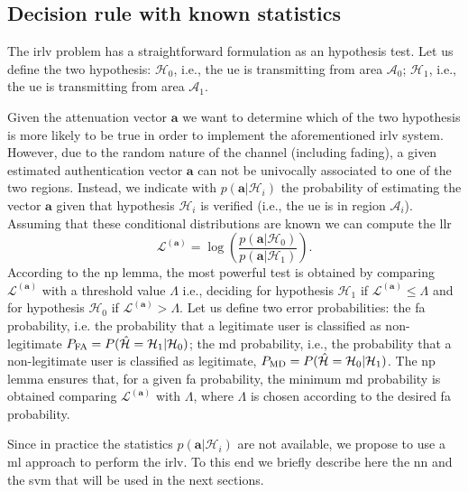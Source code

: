 \documentclass[draftcls,onecolumn,12pt]{IEEEtran}
\begin{document}
\subsection{Decision rule with known statistics}\label{sec:auth}
The \ac{irlv} problem has a straightforward formulation as an hypothesis test. Let us define the two hypothesis: $\mathcal{H}_0$, i.e., the \ac{ue} is transmitting from area $\mathcal{A}_0$; $\mathcal{H}_1$, i.e., the \ac{ue} is transmitting from area $\mathcal{A}_1$.

Given the attenuation vector $\bm{a}$ we want to determine which of the two hypothesis is more likely to be true in order to implement the aforementioned \ac{irlv} system. However, due to the random nature of the channel (including fading), a given estimated authentication vector $\bm{a}$ can not be univocally associated to one of the two regions. Instead, we indicate with $p(\bm{a}|\mathcal{H}_i)$ the probability of estimating the vector $\bm{a}$ given that hypothesis $\mathcal{H}_i$ is verified (i.e., the \ac{ue} is in region $\mathcal{A}_i$).
Assuming that these conditional distributions are known we can compute the \ac{llr}
\begin{equation}\label{eq:lr}
    \mathcal{L}^{(\bm{a})}=\log\left(\frac{p(\bm{a}|\mathcal{H}_0)}{p(\bm{a}|\mathcal{H}_1)}\right).
\end{equation}
According to the \ac{np} lemma, the most powerful test is obtained by comparing $\mathcal{L}^{(\bm{a})}$ with a threshold value $\Lambda$ i.e., deciding for hypothesis $\mathcal{H}_1$ if $\mathcal{L}^{(\bm{a})} \le \Lambda$ and for hypothesis $\mathcal{H}_0$ if $\mathcal{L}^{(\bm{a})} > \Lambda$. Let us define two error probabilities: the \ac{fa} probability, i.e. the probability  that a legitimate user is classified as non-legitimate $P_{\rm FA} =P(\hat{\mathcal H} = \mathcal H_1 | \mathcal H_0)$; the \ac{md} probability, i.e., the probability that a non-legitimate user is classified as legitimate, $P_{\rm MD}=P(\hat{\mathcal H} = \mathcal H_0 | \mathcal H_1)$. The \ac{np} lemma ensures that, for a given \ac{fa} probability, the minimum \ac{md} probability is obtained comparing $\mathcal{L}^{(\bm{a})}$ with $\Lambda$, where $\Lambda$ is chosen according to the desired \ac{fa} probability.

Since in practice the statistics $p(\bm{a}|\mathcal{H}_i)$ are not available, we propose to use a \ac{ml} approach to perform the \ac{irlv}. To this end we briefly describe here the \ac{nn} and the \ac{svm} that will be used in the next sections.
\end{document}
